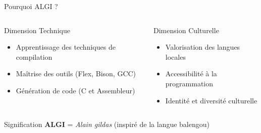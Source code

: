 \documentclass[10pt]{beamer}
\begin{document}
\begin{frame}{Pourquoi ALGI ?}
    \begin{columns}[T]
        \begin{block}{Dimension Technique}
            \begin{itemize}
                \item Apprentissage des techniques de compilation
                \item Maîtrise des outils (Flex, Bison, GCC)
                \item Génération de code (C et Assembleur)
            \end{itemize}
        \end{block}
        
        \begin{block}{Dimension Culturelle}
            \begin{itemize}
                \item Valorisation des langues locales
                \item Accessibilité à la programmation
                \item Identité et diversité culturelle
            \end{itemize}
        \end{block}
    \end{columns}
    
    \begin{alertblock}{Signification}
        \textbf{ALGI} = \textit{Alain gildas} (inspiré de la langue balengou)
    \end{alertblock}
\end{frame}
\end{document}
